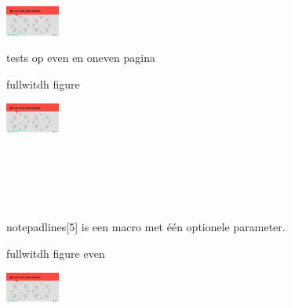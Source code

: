 \documentclass[../../main.tex]{subfiles}
\begin{document}
\begin{center}
\leavevmode
\includegraphics[width=\textwidth+\marginparsep+\marginparwidth, height=1cm]{./img/statemachineXH.png}
\end{center}

tests op even en oneven pagina

fullwitdh figure

\includegraphics[width=\textwidth, height=1cm]{./img/statemachineXH.png}

\hspace*{0cm}\noindent\makebox{\rule{\linewidth}{0.1pt}}\\
\hspace*{0in}\noindent\makebox{\rule{\textwidth}{0.5pt}}\\
\hspace*{0in}\noindent\makebox{\rule{\textwidth+\marginparsep}{1.pt}}\\
\noindent\makebox{\rule{\textwidth+\marginparsep+\marginparwidth}{1.5pt}}\\
\hspace*{-1.1in}\noindent\makebox{\rule{\paperwidth}{2.0pt}}

notepadlines[5] is een macro met \'e\'en optionele parameter.

\notepadlines[7]


\clearpage
fullwitdh figure even

\checkoddpage\ifoddpage 
  \else 
    \hspace*{-\marginparsep-\marginparwidth}
  \fi%
\includegraphics[width=\textwidth+\marginparsep+\marginparwidth, height=1cm]{./img/statemachineXH.png}
\end{document}
